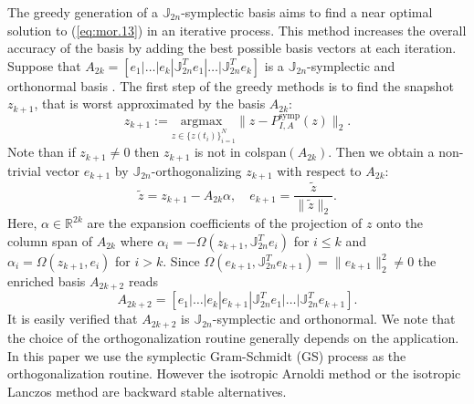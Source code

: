 The greedy generation of a $\mathbb J_{2n}$-symplectic basis aims to find a near optimal solution to (\ref{eq:mor.13}) in an iterative process. This method increases the overall accuracy of the basis by adding the best possible basis vectors at each iteration. Suppose that $A_{2k} = [e_1|\dots|e_k|\mathbb J_{2n}^T e_1|\dots|\mathbb J_{2n}^T e_k]$ is a $\mathbb J_{2n}$-symplectic and orthonormal basis \cite{doi:10.1137/17M1111991}. The first step of the greedy methods is to find the snapshot $z_{k+1}$, that is worst approximated by the basis $A_{2k}$:
\begin{equation} \label{eq:mor.14}
	z_{k+1} := \underset{z \in \{ z(t_i) \}_{i=1}^N}{\text{argmax } }\| z - P^\text{symp}_{I,A}(z) \|_2. 
\end{equation}
Note than if $z_{k+1}\neq 0$ then $z_{k+1}$ is not in colspan$(A_{2k})$. Then we obtain a non-trivial vector $e_{k+1}$ by $\mathbb J_{2n}$-orthogonalizing $z_{k+1}$ with respect to $A_{2k}$:
\begin{equation} \label{eq:mor.14.1}
	\tilde z = z_{k+1} - A_{2k}\alpha, \quad e_{k+1} = \frac{\tilde z}{\|\tilde z \|_2}.
\end{equation}
Here, $\alpha\in \mathbb R^{2k}$ are the expansion coefficients of the projection of $z$ onto the column span of $A_{2k}$ where $\alpha_i = -\Omega(z_{k+1},\mathbb J_{2n}^Te_i)$ for $i\leq k$ and $\alpha_i = \Omega(z_{k+1},e_i)$ for $i>k$. Since $\Omega(e_{k+1},\mathbb{J}_{2n}^T e_{k+1}) = \| e_{k+1} \|_2^2 \neq 0$ the enriched basis $A_{2k+2}$ reads
\begin{equation} \label{eq:mor.15}
	A_{2k+2} = [e_1|\dots|e_k|e_{k+1}|\mathbb J_{2n}^Te_1|\dots|\mathbb J_{2n}^Te_{k+1}].	
\end{equation}
It is easily verified that $A_{2k+2}$ is $\mathbb J_{2n}$-symplectic and orthonormal. We note that the choice of the orthogonalization routine generally depends on the application. In this paper we use the symplectic Gram-Schmidt (GS) process as the orthogonalization routine. However the isotropic Arnoldi method or the isotropic Lanczos method \cite{doi:10.1137/S1064827500366434} are backward stable alternatives.

